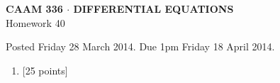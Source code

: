 \documentclass[10pt]{article}
\begin{document}
\vspace*{-5em}
\begin{center}
\large \textsf{\textbf{CAAM 336 $\cdot$ DIFFERENTIAL EQUATIONS}\\[0.5em]
Homework 40 }
\end{center}

Posted Friday 28 March 2014.  Due 1pm Friday 18 April 2014.

\begin{enumerate}\addtocounter{enumi}{39}
\item {[25 points]}  
\end{enumerate}
\end{document}

